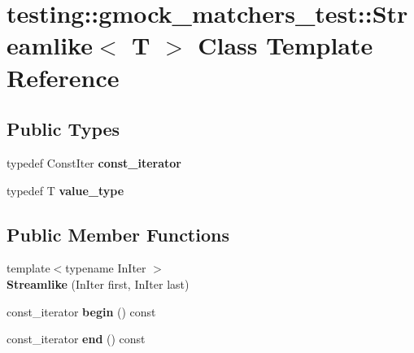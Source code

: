 \hypertarget{classtesting_1_1gmock__matchers__test_1_1Streamlike}{}\section{testing\+:\+:gmock\+\_\+matchers\+\_\+test\+:\+:Streamlike$<$ T $>$ Class Template Reference}
\label{classtesting_1_1gmock__matchers__test_1_1Streamlike}
\subsection*{Public Types}
\begin{DoxyCompactItemize}
\item 
\mbox{\label{classtesting_1_1gmock__matchers__test_1_1Streamlike_a2eeb61dca56f70d0266f5f8ae91d2c7b}} 
typedef Const\+Iter {\bfseries const\+\_\+iterator}
\item 
\mbox{\label{classtesting_1_1gmock__matchers__test_1_1Streamlike_a7e2c2e021676c1ed5dea63cdd019661c}} 
typedef T {\bfseries value\+\_\+type}
\end{DoxyCompactItemize}
\subsection*{Public Member Functions}
\begin{DoxyCompactItemize}
\item 
\mbox{\label{classtesting_1_1gmock__matchers__test_1_1Streamlike_abf5560c86ad5d9563cb8f477f06046fe}} 
{\footnotesize template$<$typename In\+Iter $>$ }\\{\bfseries Streamlike} (In\+Iter first, In\+Iter last)
\item 
\mbox{\label{classtesting_1_1gmock__matchers__test_1_1Streamlike_a1ac125e14fd2358cdb727e0044ef7f01}} 
const\+\_\+iterator {\bfseries begin} () const
\item 
\mbox{\label{classtesting_1_1gmock__matchers__test_1_1Streamlike_a3e3aa6924974abcf7855dab1094bd860}} 
const\+\_\+iterator {\bfseries end} () const
\end{DoxyCompactItemize}
